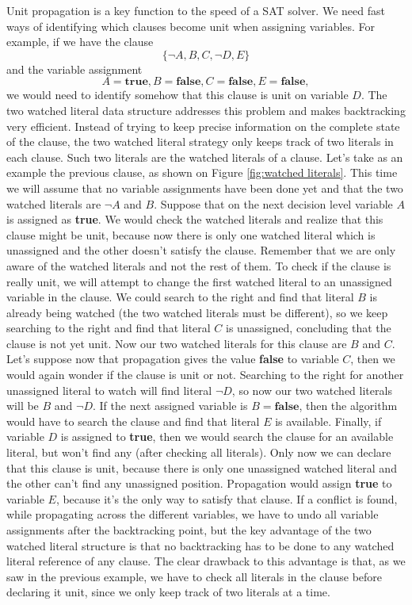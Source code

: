 \documentclass[12pt]{diicc}
\begin{document}
Unit propagation is a key function to the speed of a SAT solver. We need fast ways of identifying which clauses become unit when assigning variables. For example, if we have the clause
\[\{\neg A,B,C,\neg D,E\}\]
and the variable assignment
\[A=\textbf{true}, B=\textbf{false}, C=\textbf{false}, E=\textbf{false},\]
we would need to identify somehow that this clause is unit on variable $D$. The two watched literal data structure addresses this problem and makes backtracking very efficient. Instead of trying to keep precise information on the complete state of the clause, the two watched literal strategy only keeps track of two literals in each clause. Such two literals are the watched literals of a clause. Let's take as an example the previous clause, as shown on Figure \ref{fig:watched literals}. This time we will assume that no variable assignments have been done yet and that the two watched literals are $\neg A$ and $B$. Suppose that on the next decision level variable $A$ is assigned as \textbf{true}. We would check the watched literals and realize that this clause might be unit, because now there is only one watched literal which is unassigned and the other doesn't satisfy the clause. Remember that we are only aware of the watched literals and not the rest of them. To check if the clause is really unit, we will attempt to change the first watched literal to an unassigned variable in the clause. We could search to the right and find that literal $B$ is already being watched (the two watched literals must be different), so we keep searching to the right and find that literal $C$ is unassigned, concluding that the clause is not yet unit. Now our two watched literals for this clause are $B$ and $C$. Let's suppose now that propagation gives the value \textbf{false} to variable $C$, then we would again wonder if the clause is unit or not. Searching to the right for another unassigned literal to watch will find literal $\neg D$, so now our two watched literals will be $B$ and $\neg D$. If the next assigned variable is $B=\textbf{false}$, then the algorithm would have to search the clause and find that literal $E$ is available. Finally, if variable $D$ is assigned to \textbf{true}, then we would search the clause for an available literal, but won't find any (after checking all literals). Only now we can declare that this clause is unit, because there is only one unassigned watched literal and the other can't find any unassigned position. Propagation would assign \textbf{true} to variable $E$, because it's the only way to satisfy that clause. If a conflict is found, while propagating across the different variables, we have to undo all variable assignments after the backtracking point, but the key advantage of the two watched literal structure is that no backtracking has to be done to any watched literal reference of any clause. The clear drawback to this advantage is that, as we saw in the previous example, we have to check all literals in the clause before declaring it unit, since we only keep track of two literals at a time.  
\end{document}
